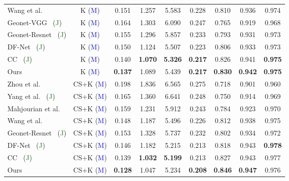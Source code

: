 \documentclass{article}
\def\etal{et al.}
\begin{document}
\begin{table}[!t]
{\begin{tabular}{l c| c c c c | c c c}
     Wang
     \etal~\cite{Wang2018CVPR} & K (\textcolor{blue}{M}) & 0.151 & 1.257 & 5.583 & 0.228 & 0.810 & 0.936 & 0.974 \\
     Geonet-VGG~\cite{yin2018geonet} (\textcolor{green}{J}) & K (\textcolor{blue}{M}) & 0.164 & 1.303 & 6.090 & 0.247 & 0.765 & 0.919 & 0.968 \\
     Geonet-Resnet~\cite{yin2018geonet} (\textcolor{green}{J}) & K (\textcolor{blue}{M}) & 0.155 & 1.296 & 5.857 & 0.233 & 0.793 & 0.931 & 0.973\\
DF-Net~\cite{zou2018df} (\textcolor{green}{J}) & K (\textcolor{blue}{M}) & 0.150 & 1.124 & 5.507 & 0.223 & 0.806 & 0.933 & 0.973\\
     CC~\cite{ranjan2019cc} (\textcolor{green}{J}) & K (\textcolor{blue}{M}) & 0.140 & \textbf{1.070} & \textbf{5.326} & \textbf{0.217} & 0.826 & 0.941 & \textbf{0.975}\\
     Ours & K (\textcolor{blue}{M}) & \textbf{0.137} & 1.089 & 5.439 & \textbf{0.217} & \textbf{0.830} & \textbf{0.942} & \textbf{0.975}\\
     \hline
     Zhou \etal~\cite{zhou2017unsupervised} & CS+K (\textcolor{blue}{M}) & 0.198 & 1.836 & 6.565 & 0.275 & 0.718 & 0.901 & 0.960 \\
     Yang \etal~\cite{yang2018unsupervised} (\textcolor{green}{J}) & CS+K (\textcolor{blue}{M}) & 0.165 & 1.360 & 6.641 & 0.248 & 0.750 & 0.914 & 0.969 \\
     Mahjourian \etal~\cite{mahjourian2018unsupervised} & CS+K (\textcolor{blue}{M}) & 0.159 & 1.231 & 5.912 & 0.243 & 0.784 & 0.923 & 0.970 \\
     Wang
     \etal~\cite{Wang2018CVPR} & CS+K (\textcolor{blue}{M}) & 0.148 & 1.187 & 5.496 & 0.226 & 0.812 & 0.938 & 0.975 \\
     Geonet-Resnet~\cite{yin2018geonet} (\textcolor{green}{J}) & CS+K (\textcolor{blue}{M}) & 0.153 & 1.328 & 5.737 & 0.232 & 0.802 & 0.934 & 0.972 \\
     DF-Net~\cite{zou2018df} (\textcolor{green}{J}) & CS+K (\textcolor{blue}{M}) & 0.146 & 1.182 & 5.215 & 0.213 & 0.818 & 0.943 & \textbf{0.978} \\
     CC~\cite{ranjan2019cc} (\textcolor{green}{J}) & CS+K (\textcolor{blue}{M}) & 0.139 & \textbf{1.032} & \textbf{5.199} & 0.213 & 0.827 & 0.943 & 0.977 \\
     Ours & CS+K (\textcolor{blue}{M}) & \textbf{0.128} & 1.047 & 5.234 & \textbf{0.208} & \textbf{0.846} & \textbf{0.947} & 0.976 \\
    \toprule[2pt]
    \end{tabular}
    }
\end{table}
\end{document}
